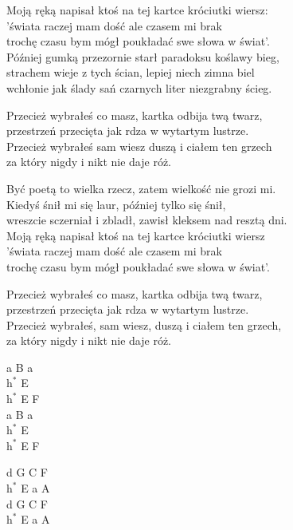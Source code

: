 \begin{text}
    \small{
    Moją ręką napisał ktoś na tej kartce króciutki wiersz:\\
    'świata raczej mam dość ale czasem mi brak\\
    trochę czasu bym mógł poukładać swe słowa w świat'.\\
    Później gumką przezornie starł paradoksu koślawy bieg,\\
    strachem wieje z tych ścian, lepiej niech zimna biel\\
    wchłonie jak ślady sań czarnych liter niezgrabny ścieg.

    Przecież wybrałeś co masz, kartka odbija twą twarz,\\
    przestrzeń przecięta jak rdza w wytartym lustrze.\\
    Przecież wybrałeś sam wiesz duszą i ciałem ten grzech\\
    za który nigdy i nikt nie daje róż.

    Być poetą to wielka rzecz, zatem wielkość nie grozi mi.\\
    Kiedyś śnił mi się laur, później tylko się śnił,\\
    wreszcie sczerniał i zbladł, zawisł kleksem nad resztą dni.\\
    Moją ręką napisał ktoś na tej kartce króciutki wiersz\\
    'świata raczej mam dość ale czasem mi brak\\
    trochę czasu bym mógł poukładać swe słowa w świat'.

    Przecież wybrałeś co masz, kartka odbija twą twarz,\\
    przestrzeń przecięta jak rdza w wytartym lustrze.\\
    Przecież wybrałeś, sam wiesz, duszą i ciałem ten grzech,\\
    za który nigdy i nikt nie daje róż.
    }
\end{text}
\begin{chord}
    \small{
    a B a\\
    $\mathrm{h^*}$ E\\
    $\mathrm{h^*}$ E F\\
    a B a\\
    $\mathrm{h^*}$ E\\
    $\mathrm{h^*}$ E F

    d G C F\\
    $\mathrm{h^*}$ E a A\\
    d G C F\\
    $\mathrm{h^*}$ E a A
    }
\end{chord}
